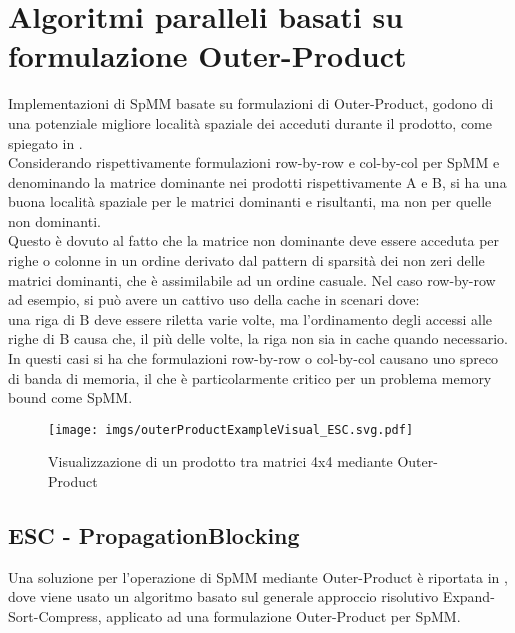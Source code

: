 \section{Algoritmi paralleli basati su formulazione Outer-Product}
Implementazioni di SpMM basate su formulazioni di Outer-Product, godono di una
potenziale migliore località spaziale dei \nnz acceduti durante il prodotto,
come spiegato in .\\
\label{ChExistingTecqs:gustavsonDerivateBadAccessLocalityNNDominantMatrix}
Considerando rispettivamente formulazioni row-by-row e col-by-col per SpMM e denominando 
la matrice dominante nei prodotti rispettivamente A e B,
si ha una buona località spaziale per le matrici dominanti e risultanti, ma non per quelle non dominanti.\\
Questo è dovuto al fatto che la matrice non dominante deve essere acceduta per righe o colonne 
in un ordine derivato dal pattern di sparsità dei non zeri delle matrici dominanti, che è assimilabile ad un ordine casuale.
\voidLine
Nel caso row-by-row ad esempio, si può avere un cattivo uso della cache in scenari dove:\\
una riga di B deve essere riletta varie volte, ma l'ordinamento degli accessi alle righe di B causa
che, il più delle volte, la riga non sia in cache quando necessario.\\
In questi casi si ha che formulazioni row-by-row o col-by-col causano uno spreco di banda di memoria,
il che è particolarmente critico per un problema memory bound come SpMM.\\
\begin{figure}[H]
  \centering \texttt{[image: imgs/outerProductExampleVisual\_ESC.svg.pdf]}
  \caption[esempio di prodotto con Outer-Product]{Visualizzazione di un prodotto tra matrici 4x4 mediante Outer-Product}
  \decoRule \label{fig:outerProductExampleVisual_ESC}
\end{figure}

\subsection{ESC - PropagationBlocking}
Una soluzione per l'operazione di SpMM mediante Outer-Product è riportata in ,
dove viene usato un algoritmo basato sul generale approccio risolutivo Expand-Sort-Compress, %
applicato ad una formulazione Outer-Product per SpMM.\\

